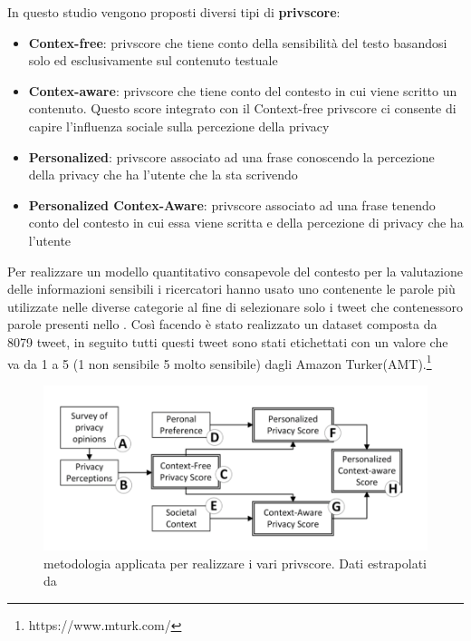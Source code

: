 In questo studio vengono proposti diversi tipi di \textbf{privscore}:
\begin{itemize}
    \item \textbf{Contex-free}: privscore che tiene conto della sensibilità del testo basandosi solo ed esclusivamente sul contenuto testuale
    \item \textbf{Contex-aware}: privscore che tiene conto del contesto in cui viene scritto un contenuto. Questo score integrato con il Context-free privscore ci consente di capire l’influenza sociale sulla percezione della privacy
    \item \textbf{Personalized}: privscore associato ad una frase conoscendo la percezione della privacy che ha l'utente che la sta scrivendo
    \item \textbf{Personalized Contex-Aware}: privscore associato ad una frase tenendo conto del contesto in cui essa viene scritta e della percezione di privacy che ha l'utente
\end{itemize}

Per realizzare un modello quantitativo consapevole del contesto per la valutazione delle informazioni sensibili i ricercatori hanno usato uno  contenente le parole più utilizzate nelle diverse categorie al fine di selezionare solo i tweet che contenessoro parole presenti nello . Così facendo è stato realizzato un dataset composta da 8079 tweet, in seguito tutti questi tweet sono stati etichettati con un valore che va da 1 a 5 (1 non sensibile 5 molto sensibile) dagli Amazon Turker(AMT).\footnote{https://www.mturk.com/}


\begin{figure}[h!t]
    \centering
    \includegraphics[width=15cm]{Figure/related_work/mtd-dontTweet.png}
    \caption{metodologia applicata per realizzare i vari privscore. Dati estrapolati da\cite{dontTweetThis}}
    \label{fig:mtd-dontTweetThis}
\end{figure}
\FloatBarrier

